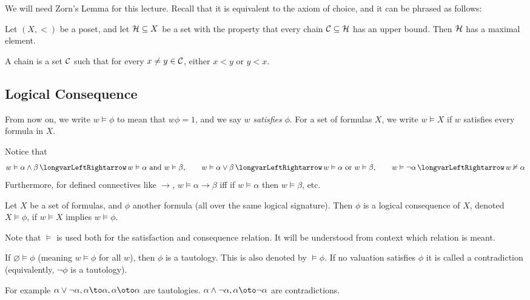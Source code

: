 
We will need Zorn's Lemma for this lecture.
Recall that it is equivalent to the axiom of choice, and it can be phrased as follows:

\blemm[title=Zorn's Lemma]

    Let $(X,<)$ be a poset, and let ${\cal H}\subseteq X$ be a set with the property that
    every chain ${\cal C}\subseteq{\cal H}$ has an upper bound.
    Then ${\cal H}$ has a maximal element.

\elemm

A chain is a set ${\cal C}$ such that for every $x\neq y\in{\cal C}$, either $x<y$ or $y<x$.

\subsection{Logical Consequence}

From now on, we write $w\vDash\phi$ to mean that $w\phi=1$, and we say $w$ {\it satisfies} $\phi$.
For a set of formulas $X$, we write $w\vDash X$ if $w$ satisfies every formula in $X$.

Notice that
$$ w\vDash\alpha\land\beta \iff w\vDash\alpha\hbox{ and } w\vDash\beta,\qquad
w\vDash\alpha\lor\beta \iff w\vDash\alpha\hbox{ or } w\vDash\beta,\qquad
w\vDash\neg\alpha \iff w\nvDash\alpha $$
Furthermore, for defined connectives like $\to$, $w\vDash\alpha\to\beta$ iff if $w\vDash\alpha$
then $w\vDash\beta$, etc.

\bdefn

    Let $X$ be a set of formulas, and $\phi$ another formula (all over the same logical
    signature).
    Then $\phi$ is a {\emphcolor logical consequence} of $X$, denoted $X\vDash\phi$, if
    $w\vDash X$ implies $w\vDash\phi$.

\edefn

Note that $\vDash$ is used both for the satisfaction and consequence relation.
It will be understood from context which relation is meant.

\bdefn

    If $\varnothing\vDash\phi$ (meaning $w\vDash\phi$ for all $w$), then $\phi$ is a
    {\emphcolor tautology}.
    This is also denoted by $\vDash\phi$.
    If no valuation satisfies $\phi$ it is called a {\emphcolor contradiction} (equivalently,
    $\neg\phi$ is a tautology).

\edefn

For example $\alpha\lor\neg\alpha,\alpha\to\alpha,\alpha\oto\alpha$ are tautologies.
$\alpha\land\neg\alpha,\alpha\oto\neg\alpha$ are contradictions.

